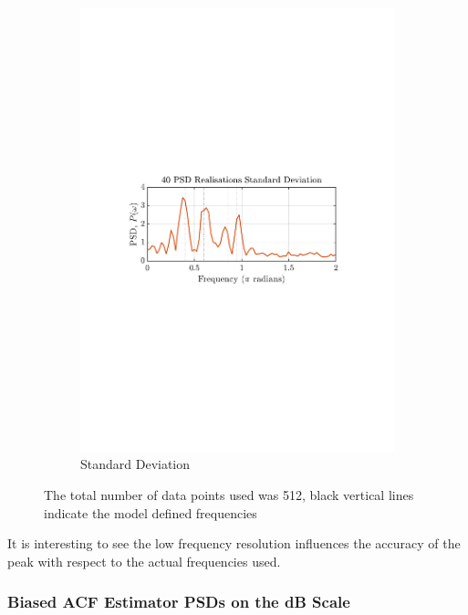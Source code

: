\documentclass[12pt]{article}
\begin{document}
\begin{figure}[H]
\begin{subfigure}{0.49\textwidth}
			\includegraphics[trim={2.2cm 11.2cm 3.15cm  11.2cm}, clip, width=\textwidth]{../MATLAB/figures/q1_3b_fig02.pdf} 
			\captionsetup{justification=centering}
			\caption{Standard Deviation}
		\end{subfigure}
		\captionsetup{justification=centering}
		\caption{The total number of data points used was 512, black vertical lines indicate the model defined frequencies}
		\label{fig: 1-3b}
	\end{figure}

	It is interesting to see the low frequency resolution influences the accuracy of the peak with respect to the actual frequencies used.

	\subsubsection{Biased ACF Estimator PSDs on the dB Scale}
\end{document}
